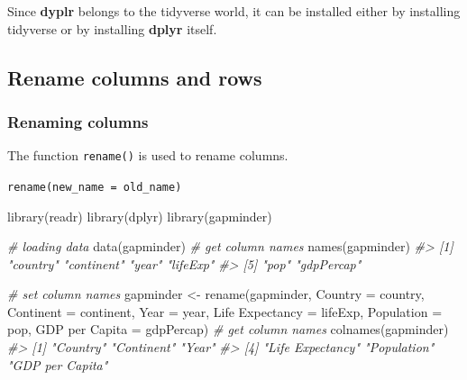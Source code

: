 \documentclass[
]{book}
\newenvironment{Shaded}{\begin{snugshade}}{\end{snugshade}}
\newcommand{\AttributeTok}[1]{\textcolor[rgb]{0.77,0.63,0.00}{#1}}
\newcommand{\CommentTok}[1]{\textcolor[rgb]{0.56,0.35,0.01}{\textit{#1}}}
\newcommand{\FunctionTok}[1]{\textcolor[rgb]{0.00,0.00,0.00}{#1}}
\newcommand{\NormalTok}[1]{#1}
\newcommand{\OtherTok}[1]{\textcolor[rgb]{0.56,0.35,0.01}{#1}}
\newcommand{\StringTok}[1]{\textcolor[rgb]{0.31,0.60,0.02}{#1}}
\begin{document}
Since \textbf{dyplr} belongs to the tidyverse world, it can be installed either by installing tidyverse or by installing \textbf{dplyr} itself.

\hypertarget{rename-columns-and-rows}{%
\subsection{Rename columns and rows}\label{rename-columns-and-rows}}

\hypertarget{tr-col-names}{%
\subsubsection{Renaming columns}\label{tr-col-names}}

The function \texttt{rename()} is used to rename columns.

\texttt{rename(new\_name\ =\ old\_name)}

\begin{Shaded}
\begin{Highlighting}[]
\FunctionTok{library}\NormalTok{(readr)}
\FunctionTok{library}\NormalTok{(dplyr)}
\FunctionTok{library}\NormalTok{(gapminder)}

\CommentTok{\# loading data}
\FunctionTok{data}\NormalTok{(gapminder)}
\CommentTok{\# get column names}
\FunctionTok{names}\NormalTok{(gapminder)}
\CommentTok{\#\textgreater{} [1] "country"   "continent" "year"      "lifeExp"  }
\CommentTok{\#\textgreater{} [5] "pop"       "gdpPercap"}

\CommentTok{\# set column names}
\NormalTok{gapminder }\OtherTok{\textless{}{-}} \FunctionTok{rename}\NormalTok{(gapminder, }
                    \AttributeTok{Country =}\NormalTok{ country, }
                    \AttributeTok{Continent =}\NormalTok{ continent, }
                    \AttributeTok{Year =}\NormalTok{ year, }
                    \StringTok{\textasciigrave{}}\AttributeTok{Life Expectancy}\StringTok{\textasciigrave{}} \OtherTok{=}\NormalTok{ lifeExp, }
                    \AttributeTok{Population =}\NormalTok{ pop, }
                    \StringTok{\textasciigrave{}}\AttributeTok{GDP per Capita}\StringTok{\textasciigrave{}} \OtherTok{=}\NormalTok{ gdpPercap)}
\CommentTok{\# get column names}
\FunctionTok{colnames}\NormalTok{(gapminder)}
\CommentTok{\#\textgreater{} [1] "Country"         "Continent"       "Year"           }
\CommentTok{\#\textgreater{} [4] "Life Expectancy" "Population"      "GDP per Capita"}
\end{Highlighting}
\end{Shaded}
\end{document}
